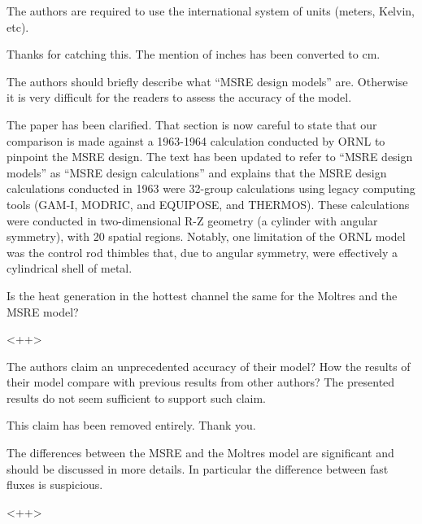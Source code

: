 \documentclass[answers,11pt]{exam}
\begin{document}
\begin{questions}
\question The authors are required to use the international system of units (meters, Kelvin, etc).
\begin{solution}
        Thanks for catching this. The mention of inches has been converted to cm.
\end{solution}

\question The authors should briefly describe what ``MSRE design models''
are. Otherwise it is very difficult for the readers to assess the accuracy of
the model.
\begin{solution}
        The paper has been clarified. That section is now careful to state that
        our comparison is made against a 1963-1964 calculation conducted by ORNL
        to pinpoint the MSRE design. The text has been updated to refer to
        ``MSRE design models'' as ``MSRE design calculations'' and explains
        that the MSRE design calculations conducted in 1963 were 32-group
        calculations using legacy computing tools (GAM-I, MODRIC, and EQUIPOSE,
        and THERMOS). These calculations were conducted in two-dimensional R-Z
        geometry (a cylinder with angular symmetry), with 20 spatial regions.
        Notably, one limitation of the ORNL model was the control rod thimbles
        that, due to angular symmetry, were effectively a cylindrical shell of
        metal.
\end{solution}

\question Is the heat generation in the hottest channel the same for the Moltres and the MSRE model?
\begin{solution}
        <++>
\end{solution}

\question The authors claim an unprecedented accuracy of their model? How the
results of their model compare with previous results from other authors? The
presented results do not seem sufficient to support such claim.
\begin{solution}
        This claim has been removed entirely. Thank you.
\end{solution}

\question The differences between the MSRE and the Moltres model are significant
and should be discussed in more details. In particular the difference between
fast fluxes is suspicious.
\begin{solution}
        <++>
\end{solution}


\end{questions}
\end{document}
